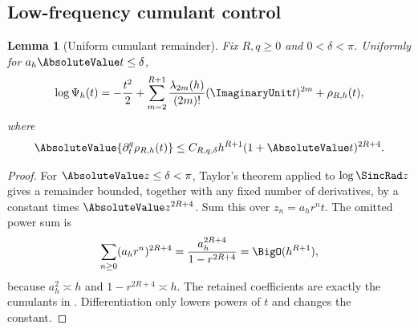 \documentclass[11pt]{article}
\numberwithin{equation}{section}
\newtheorem{lemma}[theorem]{Lemma}
\theoremstyle{definition}
\begin{document}
\subsection{Low-frequency cumulant control}
\begin{lemma}[Uniform cumulant remainder]\label{lem:cumulant-remainder}
Fix \(R,q\ge0\) and \(0<\delta<\pi\).  Uniformly for \(a_h\AbsoluteValue t\le\delta\),
\begin{equation}\label{eq:logpsi-trunc}
 \log\Psi_h(t)
 =-\frac{t^2}{2}
 +\sum_{m=2}^{R+1}\frac{\lambda_{2m}(h)}{(2m)!}(\ImaginaryUnit t)^{2m}
 +\rho_{R,h}(t),
\end{equation}
where
\begin{equation}\label{eq:rho-bound}
 \AbsoluteValue{\partial_t^q\rho_{R,h}(t)}
 \le C_{R,q,\delta}h^{R+1}(1+\AbsoluteValue t)^{2R+4}.
\end{equation}
\end{lemma}

\begin{proof}
For \(\AbsoluteValue z\le\delta<\pi\), Taylor's theorem applied to \(\log\SincRad z\) gives a remainder bounded, together with any fixed number of derivatives, by a constant times \(\AbsoluteValue z^{2R+4}\).  Sum this over \(z_n=a_hr^nt\).  The omitted power sum is
\[
 \sum_{n\ge0}(a_hr^n)^{2R+4}
 =\frac{a_h^{2R+4}}{1-r^{2R+4}}
 =\BigO(h^{R+1}),
\]
because \(a_h^2\asymp h\) and \(1-r^{2R+4}\asymp h\).  The retained coefficients are exactly the cumulants in .  Differentiation only lowers powers of \(t\) and changes the constant.
\end{proof}
\end{document}
